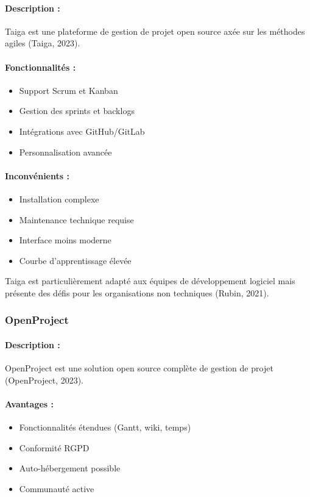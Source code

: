 \paragraph{Description :} Taiga est une plateforme de gestion de projet open source axée sur les méthodes agiles (Taiga, 2023).

\paragraph{Fonctionnalités :}
\begin{itemize}
    \item Support Scrum et Kanban
    \item Gestion des sprints et backlogs
    \item Intégrations avec GitHub/GitLab
    \item Personnalisation avancée
\end{itemize}

\paragraph{Inconvénients :}
\begin{itemize}
    \item Installation complexe
    \item Maintenance technique requise
    \item Interface moins moderne
    \item Courbe d'apprentissage élevée
\end{itemize}

Taiga est particulièrement adapté aux équipes de développement logiciel mais présente des défis pour les organisations non techniques (Rubin, 2021).

\subsubsection{OpenProject}
\paragraph{Description :} OpenProject est une solution open source complète de gestion de projet (OpenProject, 2023).

\paragraph{Avantages :}
\begin{itemize}
    \item Fonctionnalités étendues (Gantt, wiki, temps)
    \item Conformité RGPD
    \item Auto-hébergement possible
    \item Communauté active
\end{itemize}


